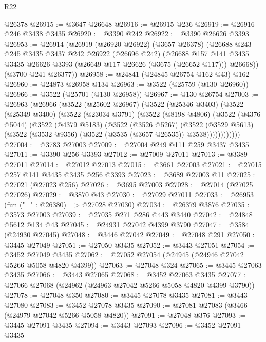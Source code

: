 \begin{lexlean}{R22}
\begin{coremodule}
    @26378
@26915 := @3647 @26648
@26916 := @26915 @236
@26919 := @26916 @246 @3438 @3435
@26920 := @3390 @242
@26922 := @3390 @26626 @3393
@26953 := @26914
    (@26919
      (@26920 @26922)
      (@3657 @26378)
      (@26688
        @243
        @245
        @3435
        @3437
        @242
        @26922
        (@26696 @242)
        (@26688
          @157
          @141
          @3435
          @3435
          @26626
          @3393
          (@26649 @117 @26626 (@3675 (@26652 @117)))
          @26668))
      (@3700 @241 @26377))
@26958 := @24841 (@24845 @26754 @162 @43) @162
@26960 := @24873 @26958 @134
@26963 := @3522 (@25759 (@130 @26960))
@26966 := @3522 (@25701 (@130 @26958))
@26967 := @130 @26754
@27003 := @26963
    (@26966
      (@3522
        (@25602 @26967)
        (@3522
          (@25346 @3403)
          (@3522
            (@25349 @3400)
            (@3522
              (@23034 @3791)
              (@3522
                (@8198 @4806)
                (@3522
                  (@4376 @5044)
                  (@3522
                    (@4379 @5183)
                    (@3522
                      (@3526 @5267)
                      (@3522
                        (@3529 @5613)
                        (@3522 (@3532 @9356) (@3522 (@3535 (@3657 @26535)) @3538))))))))))))
@27004 := @3783 @27003
@27009 := @27004 @249 @111 @259 @3437 @3435
@27011 := @3390 @256 @3393
@27012 := @27009 @27011
@27013 := @3389 @27011
@27014 := @27012 @27013
@27015 := @3661 @27003
@27021 := @27015 @257 @141 @3435 @3435 @256 @3393
@27023 := @3689 @27003 @11
@27025 := @27021 (@27023 @256)
@27026 := @3695 @27003
@27028 := @27014 (@27025 @27026)
@27029 := @3870 @43
@27030 := @27029 @27011
@27033 := @26953 (fun ("_" : @26380) => @27028 @27030)
@27034 := @26379 @3876
@27035 := @3573 @27003
@27039 := @27035 @271 @286 @443 @3440
@27042 := @24848 @5612 @134 @43
@27045 := @24931 @27042 @4399 @3790
@27047 := @3584 (@24930 @27045)
@27048 := @3446 @27042
@27049 := @27048 @291
@27050 := @3445 @27049
@27051 := @27050 @3435
@27052 := @3443 @27051
@27054 := @3452 @27049 @3435
@27062 := @27052 @27054 (@24945 (@24946 @27042 @5266 @5058 @4820 @4399))
@27063 := @27048 @324
@27065 := @3445 @27063 @3435
@27066 := @3443 @27065
@27068 := @3452 @27063 @3435
@27077 := @27066 @27068 (@24962 (@24963 @27042 @5266 @5058 @4820 @4399 @3790))
@27078 := @27048 @350
@27080 := @3445 @27078 @3435
@27081 := @3443 @27080
@27083 := @3452 @27078 @3435
@27090 := @27081 @27083 (@3466 (@24979 @27042 @5266 @5058 @4820))
@27091 := @27048 @376
@27093 := @3445 @27091 @3435
@27094 := @3443 @27093
@27096 := @3452 @27091 @3435

\end{coremodule}
\end{lexlean}
